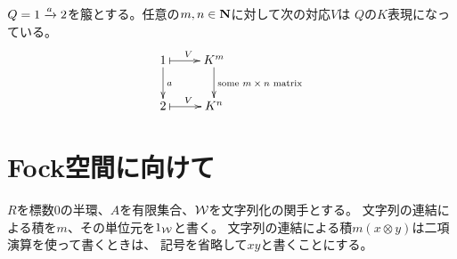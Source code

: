 	\begin{example}[箙の表現の例]\label{eg:箙の表現の例} %
		$Q=1\xrightarrow{a}2$を箙とする。任意の$m,n\in{\ensuremath{\mathbf{N}}}$に対して次の対応$V$は
		$Q$の$K$表現になっている。
		\begin{equation*}\xymatrix{
			1 \ar[d]^a \ar@{|->}[r]^V 
				& K^m \ar[d]^{\text{some $m\times n$ matrix}} \\
			2 \ar@{|->}[r]^V & K^n \\
		}\end{equation*}
	\end{example} %
%
\section{Fock空間に向けて}\label{s1:Fock空間に向けて} %
	$R$を標数$0$の半環、$A$を有限集合、$\mathcal{W}$を文字列化の関手とする。
	文字列の連結による積を$m$、その単位元を$1_{\mathcal{W}}$と書く。
	文字列の連結による積$m(x\otimes y)$は二項演算を使って書くときは、
	記号を省略して$xy$と書くことにする。

